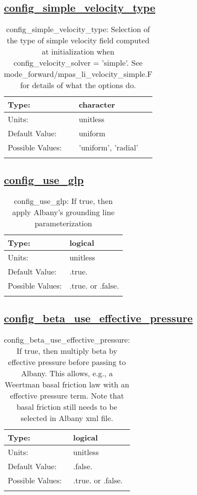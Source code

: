 \subsection[config\_simple\_velocity\_type]{\hyperref[sec:nm_tab_velocity_solver]{config\_simple\_velocity\_type}}
\label{subsec:nm_sec_config_simple_velocity_type}
\begin{center}
\begin{longtable}{| p{2.0in} || p{4.0in} |}
    \hline
    Type: & character \\
    \hline
    Units: & \si{unitless} \\
    \hline
    Default Value: & uniform \\
    \hline
    Possible Values: & 'uniform', 'radial' \\
    \hline
    \caption{config\_simple\_velocity\_type: Selection of the type of simple velocity field computed at initialization when config\_velocity\_solver = 'simple'.  See mode\_forward/mpas\_li\_velocity\_simple.F for details of what the options do.}
\end{longtable}
\end{center}
\subsection[config\_use\_glp]{\hyperref[sec:nm_tab_velocity_solver]{config\_use\_glp}}
\label{subsec:nm_sec_config_use_glp}
\begin{center}
\begin{longtable}{| p{2.0in} || p{4.0in} |}
    \hline
    Type: & logical \\
    \hline
    Units: & \si{unitless} \\
    \hline
    Default Value: & .true. \\
    \hline
    Possible Values: & .true. or .false. \\
    \hline
    \caption{config\_use\_glp: If true, then apply Albany's grounding line parameterization}
\end{longtable}
\end{center}
\subsection[config\_beta\_use\_effective\_pressure]{\hyperref[sec:nm_tab_velocity_solver]{config\_beta\_use\_effective\_pressure}}
\label{subsec:nm_sec_config_beta_use_effective_pressure}
\begin{center}
\begin{longtable}{| p{2.0in} || p{4.0in} |}
    \hline
    Type: & logical \\
    \hline
    Units: & \si{unitless} \\
    \hline
    Default Value: & .false. \\
    \hline
    Possible Values: & .true. or .false. \\
    \hline
    \caption{config\_beta\_use\_effective\_pressure: If true, then multiply beta by effective pressure before passing to Albany.  This allows, e.g., a Weertman basal friction law with an effective pressure term.  Note that basal friction still needs to be selected in Albany xml file.}
\end{longtable}
\end{center}
